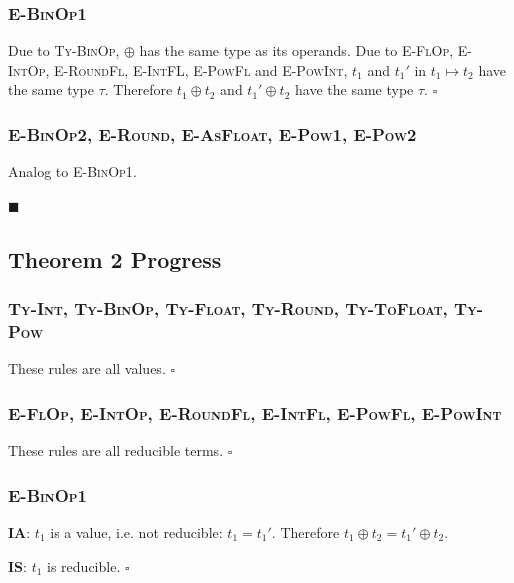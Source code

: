 \documentclass[13pt, a4paper]{article}
\begin{document}
\subsubsection*{\textmd{\textsc{E-BinOp1}}}
Due to \textsc{Ty-BinOp}, $\oplus$ has the same type as its operands. Due to \textsc{E-FlOp}, \textsc{E-IntOp}, \textsc{E-RoundFl}, \textsc{E-IntFL}, \textsc{E-PowFl} and \textsc{E-PowInt}, $t_1$ and $t_1'$ in $t_1 \mapsto t_2$ have the same type $\tau$. Therefore $t_1 \oplus t_2$ and $t_1' \oplus t_2$ have the same type $\tau$. $\square$

\subsubsection*{\textmd{\textsc{E-BinOp2}, \textsc{E-Round}, \textsc{E-AsFloat}, \textsc{E-Pow1}, \textsc{E-Pow2}}}
Analog to \textsc{E-BinOp1}.

\noindent$\blacksquare$

\subsection*{Theorem 2 \textmd{Progress}} %

\subsubsection*{\textmd{\textsc{Ty-Int}, \textsc{Ty-BinOp}, \textsc{Ty-Float}, \textsc{Ty-Round}, \textsc{Ty-ToFloat}, \textsc{Ty-Pow}}}

These rules are all values. $\square$

\subsubsection*{\textmd{\textsc{E-FlOp}, \textsc{E-IntOp}, \textsc{E-RoundFl}, \textsc{E-IntFl}, \textsc{E-PowFl}, \textsc{E-PowInt}}}

These rules are all reducible terms. $\square$

\subsubsection*{\textmd{\textsc{E-BinOp1}}}

\textbf{IA}: $t_1$ is a value, i.e. not reducible: $t_1 =t_1'$. Therefore $t_1 \oplus t_2 = t_1' \oplus t_2$.

\noindent \textbf{IS}: $t_1$ is reducible. $\square$
\end{document}
